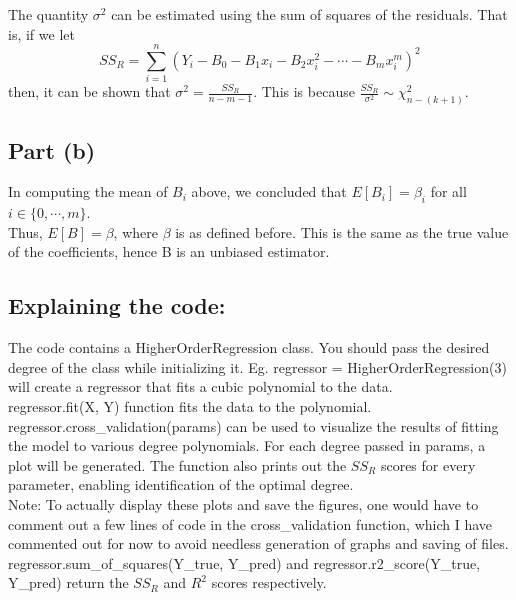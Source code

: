 The quantity $\sigma^2$ can be estimated using the sum of squares of the residuals. That is, if we let
\[
    SS_R=\sum_{i=1}^n (Y_i - B_0 - B_1 x_i - B_2 x_i^2 - \cdots - B_m x_i^m)^2
\] 
then, it can be shown that $\sigma^2 = \frac{SS_R}{n-m-1}$. This is because $\frac{SS_R}{\sigma^2} \sim \chi_{n-(k+1)}^2$.
\subsection{Part (b)}
In computing the mean of $B_i$ above, we concluded that $E[B_i]=\beta_i$ for all $i\in\{0,\cdots,m\}$.\\
Thus, $E[B]=\beta$, where $\beta$ is as defined before. This is the same as the true value of the coefficients, hence B is an unbiased estimator.\\ 
\subsection{Explaining the code: }
The code contains a HigherOrderRegression class. You should pass the desired degree of the class while initializing it. Eg. regressor = HigherOrderRegression(3) will create a regressor that fits a cubic polynomial to the data.\\
regressor.fit(X, Y) function fits the data to the polynomial.\\
regressor.cross\_validation(params) can be used to visualize the results of fitting the model to various degree polynomials. For each degree passed in params, a plot will be generated. The function also prints out the $SS_R$ scores for every parameter, enabling identification of the optimal degree.\\
Note: To actually display these plots and save the figures, one would have to comment out a few lines of code in the cross\_validation function, which I have commented out for now to avoid needless generation of graphs and saving of files.\\
regressor.sum\_of\_squares(Y\_true, Y\_pred) and regressor.r2\_score(Y\_true, Y\_pred) return the $SS_R$ and $R^2$ scores respectively.\\
